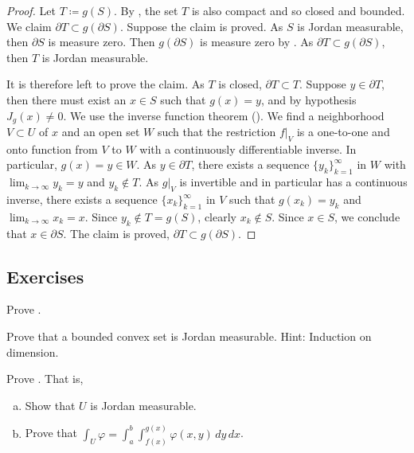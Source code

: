 \begin{proof}
Let $T \coloneqq g(S)$.  %
By 
,
the set
$T$ is also compact and so closed and bounded.
We claim $\partial T \subset g(\partial S)$.  Suppose the claim is proved.
As $S$ is Jordan measurable, then
$\partial S$ is measure zero.  Then  $g(\partial S)$ is measure
zero by .  As $\partial T \subset g(\partial
S)$, then $T$ is Jordan measurable.

It is therefore left to prove the claim.
As $T$ is closed, $\partial T \subset T$.
Suppose $y \in \partial T$, then there must exist an
$x \in S$
such that $g(x) = y$, and by hypothesis $J_g(x) \not= 0$.
We use the inverse function theorem ().  We find 
a neighborhood $V \subset U$ of $x$ and an open set $W$ such that
the restriction $f|_V$ is a one-to-one and onto function from $V$ to $W$
with a continuously differentiable inverse.  In particular, $g(x) = y \in W$.
As $y \in \partial T$, there exists a sequence $\{ y_k \}_{k=1}^\infty$ in $W$ with
$\lim_{k\to\infty} y_k = y$ and $y_k \notin T$.  As $g|_V$ is invertible and in
particular has a continuous inverse, there exists
a sequence $\{ x_k \}_{k=1}^\infty$ in $V$ such that $g(x_k) = y_k$ and
$\lim_{k\to\infty} x_k = x$.
Since $y_k \notin T = g(S)$, clearly $x_k \notin S$.  Since $x \in S$, we
conclude that $x \in \partial S$.  The claim is proved, $\partial T \subset
g(\partial S)$.
\end{proof}

\subsection{Exercises}

\begin{exercise}
Prove .
\end{exercise}

\begin{exercise}
Prove that a bounded convex set is Jordan measurable.  Hint: Induction on
dimension.
\end{exercise}

\begin{exercise} \label{exercise:intovertypeIset}
Prove .  That is,
\begin{enumerate}[a)]
\item
Show that $U$ is Jordan measurable.
\item
Prove that
$\int_U \varphi =
\int_a^b \int_{f(x)}^{g(x)} \varphi(x,y) \, dy \, dx$.
\end{enumerate}
\end{exercise}

